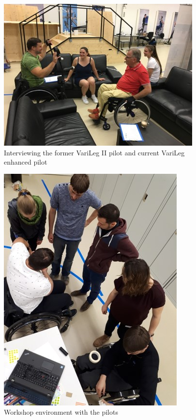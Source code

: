 \begin{figure}
    \centering
    \includegraphics[width=1.0\columnwidth]{Appendix/User-centered_design_method/WS_Werner.jpg}
    \caption{Interviewing the former VariLeg II pilot and current VariLeg enhanced pilot}
    \label{fig:interview}
\end{figure}
\begin{figure}
    \centering
    \includegraphics{Appendix/User-centered_design_method/WS_Rolf.jpg}
    \caption{Workshop environment with the pilots}
    \label{fig:ws_up}
\end{figure}
